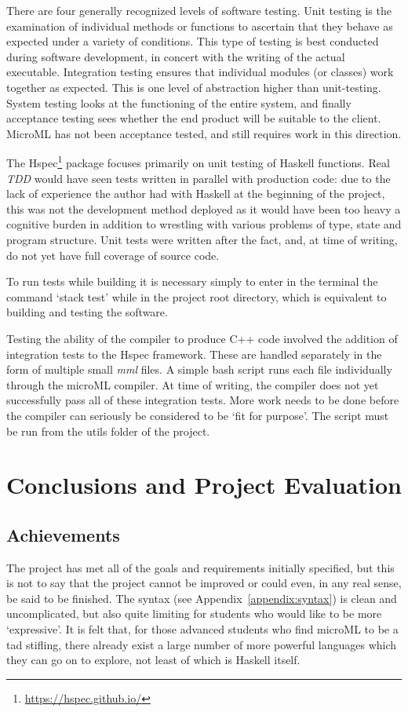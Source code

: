 \documentclass[12pt, a4paper]{report}
\begin{document}
There are four generally recognized levels of software testing. Unit testing is the examination of
individual methods or functions to ascertain that they behave as expected under a variety of
conditions. This type of testing is best conducted during software development, in concert with the
writing of the actual executable. Integration testing ensures that individual modules (or
classes) work together as expected. This is one level of abstraction higher than unit-testing.
System testing looks at the functioning of the entire system, and finally acceptance testing sees
whether the end product will be suitable to the client. MicroML has not been acceptance tested, and
still requires work in this direction.

The Hspec\footnote{\url{https://hspec.github.io/}} package focuses primarily on unit testing of
Haskell functions. Real \textit{TDD} would have seen tests written in parallel with production code:
due to the lack of experience the author had with Haskell at the beginning of the project, this was
not the development method deployed as it would have been too heavy a cognitive burden in addition
to wrestling with various problems of type, state and program structure. Unit tests were written
after the fact, and, at time of writing, do not yet have full coverage of source code.

To run tests while building it is necessary simply to enter in the terminal the command `stack test'
while in the project root directory, which is equivalent to building and testing the
software.

Testing the ability of the compiler to produce C++ code involved the addition of integration tests
to the Hspec framework. These are handled separately in the form of multiple small \textit{mml}
files. A simple bash script runs each file individually through the microML compiler. At time of
writing, the compiler does not yet successfully pass all of these integration tests. More work needs
to be done before the compiler can seriously be considered to be `fit for purpose'. The script must
be run from the utils folder of the project.

\chapter{Conclusions and Project Evaluation}

\section{Achievements}
The project has met all of the goals and requirements initially specified, but this is not to say
that the project cannot be improved or could even, in any real sense, be said to be finished. The
syntax (see Appendix~\ref{appendix:syntax}) is clean and uncomplicated, but also quite limiting for
students who would like to be more `expressive'. It is felt that, for those advanced students who
find microML to be a tad stifling, there already exist a large number of more powerful languages
which they can go on to explore, not least of which is Haskell itself. 
\end{document}
